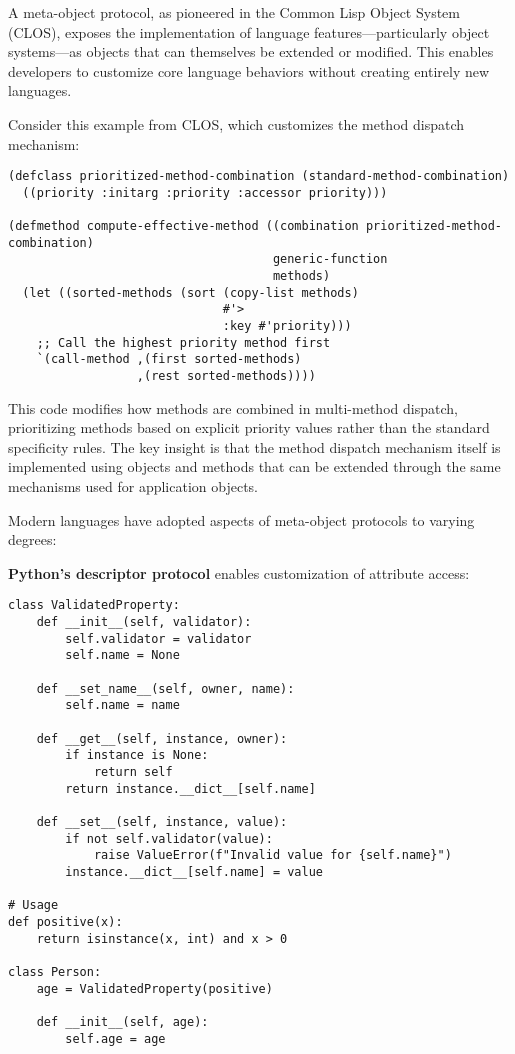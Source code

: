\documentclass[11pt]{article}
\begin{document}
A meta-object protocol, as pioneered in the Common Lisp Object System (CLOS), exposes the implementation of language features—particularly object systems—as objects that can themselves be extended or modified. This enables developers to customize core language behaviors without creating entirely new languages.

Consider this example from CLOS, which customizes the method dispatch mechanism:

\begin{verbatim}
(defclass prioritized-method-combination (standard-method-combination)
  ((priority :initarg :priority :accessor priority)))

(defmethod compute-effective-method ((combination prioritized-method-combination)
                                     generic-function
                                     methods)
  (let ((sorted-methods (sort (copy-list methods)
                              #'>
                              :key #'priority)))
    ;; Call the highest priority method first
    `(call-method ,(first sorted-methods)
                  ,(rest sorted-methods))))
\end{verbatim}

This code modifies how methods are combined in multi-method dispatch, prioritizing methods based on explicit priority values rather than the standard specificity rules. The key insight is that the method dispatch mechanism itself is implemented using objects and methods that can be extended through the same mechanisms used for application objects.

Modern languages have adopted aspects of meta-object protocols to varying degrees:

\textbf{\textbf{Python's descriptor protocol}} enables customization of attribute access:

\begin{verbatim}
class ValidatedProperty:
    def __init__(self, validator):
        self.validator = validator
        self.name = None

    def __set_name__(self, owner, name):
        self.name = name

    def __get__(self, instance, owner):
        if instance is None:
            return self
        return instance.__dict__[self.name]

    def __set__(self, instance, value):
        if not self.validator(value):
            raise ValueError(f"Invalid value for {self.name}")
        instance.__dict__[self.name] = value

# Usage
def positive(x):
    return isinstance(x, int) and x > 0

class Person:
    age = ValidatedProperty(positive)

    def __init__(self, age):
        self.age = age
\end{verbatim}
\end{document}
